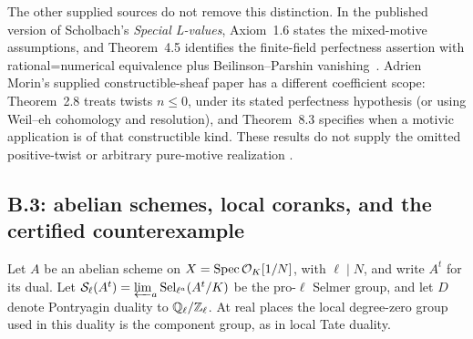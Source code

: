 The other supplied sources do not remove this distinction.  In the
published version of Scholbach's \emph{Special L-values}, Axiom~1.6
states the mixed-motive assumptions, and Theorem~4.5 identifies the
finite-field perfectness assertion with rational=numerical equivalence
plus Beilinson--Parshin vanishing~\cite{BScholbachSpecial2017}.
Adrien Morin's supplied constructible-sheaf paper has a different
coefficient scope: Theorem~2.8 treats twists \(n\le0\), under
its stated perfectness hypothesis (or using Weil--eh cohomology and
resolution), and Theorem~8.3 specifies when a motivic application is
of that constructible kind.  These results do not supply the omitted
positive-twist or arbitrary pure-motive realization
\cite{BAdrienMorin2024}.



\subsection{B.3: abelian schemes, local coranks, and the certified counterexample}
Let \(A\) be an abelian scheme on
\(X=\operatorname{Spec}\mathcal O_K[1/N]\), with \(\ell\mid N\), and write
\(A^t\) for its dual.  Let
\(\mathcal S_\ell(A^t)=\varprojlim_a\operatorname{Sel}_{\ell^a}(A^t/K)\)
be the pro-\(\ell\) Selmer group, and let \(D\) denote Pontryagin
duality to \(\mathbb Q_\ell/\mathbb Z_\ell\).  At real places the local degree-zero
group used in this duality is the component group, as in local Tate
duality.

